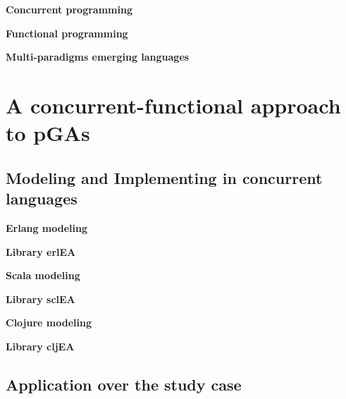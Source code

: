 \documentclass[9pt, technote]{IEEEtran}
\newcommand{\simpleEntry}[1]{
\vspace{.3cm}
\noindent \textbf{#1}
\vspace{.3cm}
}
\begin{document}



\simpleEntry{Concurrent programming}
    

\simpleEntry{Functional programming}
    

\simpleEntry{Multi-paradigms emerging languages} %
    

\section{A concurrent-functional approach to pGAs}
\label{sec:design}
    

\subsection{Modeling and Implementing in concurrent languages}
\label{sec:impl}
    

\simpleEntry{Erlang modeling}
    

\simpleEntry{Library erlEA}
    

\simpleEntry{Scala modeling}
    

\simpleEntry{Library sclEA}
    

\simpleEntry{Clojure modeling}
    

\simpleEntry{Library cljEA}
    

\subsection{Application over the study case} \label{sec:results}%
    
\end{document}
